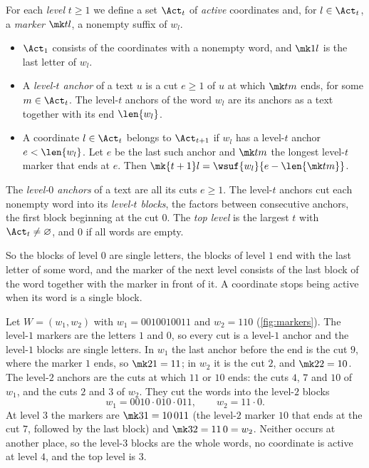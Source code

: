 \begin{definition}\label{def:markers}
For each \emph{level} $t\ge1$ we define a set $\Act_t$ of \emph{active}
coordinates and, for $l\in\Act_t$, a \emph{marker} $\mk tl$, a nonempty
suffix of $w_l$.
\begin{itemize}
\item $\Act_1$ consists of the coordinates with a nonempty word, and $\mk 1l$
  is the last letter of $w_l$.
\item A \emph{level-$t$ anchor} of a text $u$ is a cut $e\ge1$ of $u$ at
  which $\mk tm$ ends, for some $m\in\Act_t$. The level-$t$ anchors of the
  word $w_l$ are its anchors as a text together with its end $\len{w_l}$.
\item A coordinate $l\in\Act_t$ belongs to $\Act_{t+1}$ if $w_l$ has a
  level-$t$ anchor $e<\len{w_l}$. Let $e$ be the last such anchor and
  $\mk tm$ the longest level-$t$ marker that ends at $e$. Then
  $\mk{t+1}l=\wsuf{w_l}{e-\len{\mk tm}}$.
\end{itemize}
The \emph{level-$0$ anchors} of a text are all its cuts $e\ge1$. The
level-$t$ anchors cut each nonempty word into its \emph{level-$t$ blocks},
the factors between consecutive anchors, the first block beginning at the
cut $0$. The \emph{top level} is the largest $t$ with $\Act_t\ne\varnothing$,
and $0$ if all words are empty.
\end{definition}



So the blocks of level $0$ are single letters, the blocks of level $1$ end
with the last letter of some word, and the marker of the next level consists
of the last block of the word together with the marker in front of it. A
coordinate stops being active when its word is a single block.

\begin{example}\label{ex:hierarchy}
Let $W=(w_1,w_2)$ with $w_1=0010010011$ and $w_2=110$
(\cref{fig:markers}). The level-$1$
markers are the letters $1$ and $0$, so every cut is a level-$1$ anchor and
the level-$1$ blocks are single letters. In $w_1$ the last anchor before the
end is the cut $9$, where the marker $1$ ends, so $\mk21=11$; in $w_2$ it is
the cut $2$, and $\mk22=10$. The level-$2$ anchors are the cuts at which $11$
or $10$ ends: the cuts $4$, $7$ and $10$ of $w_1$, and the cuts $2$ and $3$
of $w_2$. They cut the words into the level-$2$ blocks
\[
  w_1=0010\cdot010\cdot011,\qquad w_2=11\cdot0 .
\]
At level $3$ the markers are $\mk31=10\,011$ (the level-$2$ marker $10$ that
ends at the cut $7$, followed by the last block) and $\mk32=11\,0=w_2$.
Neither occurs at another place, so the level-$3$ blocks are the whole words,
no coordinate is active at level $4$, and the top level is $3$.
\end{example}

